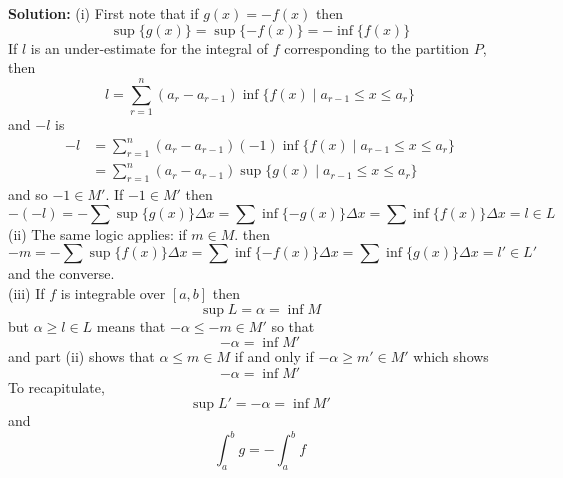 \documentclass{article}
\newcommand{\solution}[1]{\setlength{\hangindent}{\parindent} \indent\indent \textbf{Solution: }#1\hfill\break}
\begin{document}
\solution{(i) First note that if $g(x) = -f(x)$ then
$$\sup\{g(x)\} = \sup\{-f(x)\} = -\inf\{f(x)\}$$
If $l$ is an under-estimate for the integral of $f$ corresponding to the partition $P$, then
$$l = \sum_{r=1}^n (a_r-a_{r-1})\inf\{f(x)\mid a_{r-1}\leq x\leq a_r\}$$
and $-l$ is
\begin{align*}
-l &= \sum_{r=1}^n (a_r-a_{r-1})(-1)\inf\{f(x)\mid a_{r-1}\leq x\leq a_r\}\\
&= \sum_{r=1}^n (a_r-a_{r-1})\sup\{g(x)\mid a_{r-1}\leq x\leq a_r\} 
\end{align*}
and so $-1\in M'$. If $-1\in M'$ then
$$-(-l) = -\sum\sup\{g(x)\}\Delta x = \sum\inf\{-g(x)\}\Delta x = \sum\inf\{f(x)\}\Delta x = l\in L$$
\indent (ii) The same logic applies: if $m\in M$. then
$$-m = -\sum\sup\{f(x)\}\Delta x = \sum\inf\{-f(x)\}\Delta x = \sum\inf\{g(x)\}\Delta x = l' \in L'$$
and the converse. \\
\indent (iii) If $f$ is integrable over $[a,b]$ then 
$$\sup L =\alpha =  \inf M$$
but $\alpha \geqslant l\in L$ means that $-\alpha \leqslant -m\in M'$ so that 
$$-\alpha = \inf M'$$
and part (ii) shows that $\alpha \leqslant m\in M$ if and only if $-\alpha \geqslant m'\in  M'$ which shows
$$-\alpha = \inf M'$$
To recapitulate,
$$\sup L' = -\alpha = \inf M'$$
and 
$$\int_a^b g = -\int_a^b f$$}%

\newpage
\end{document}
